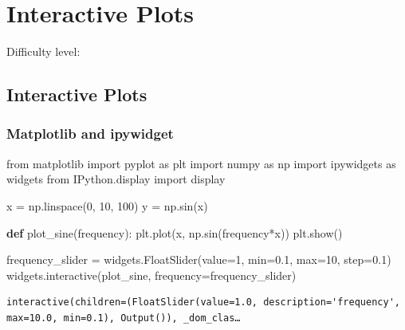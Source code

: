 \documentclass[
  letterpaper,
  DIV=11,
  numbers=noendperiod]{scrreprt}
\newenvironment{Shaded}{\begin{snugshade}}{\end{snugshade}}
\newcommand{\BuiltInTok}[1]{\textcolor[rgb]{0.00,0.23,0.31}{#1}}
\newcommand{\DecValTok}[1]{\textcolor[rgb]{0.68,0.00,0.00}{#1}}
\newcommand{\FloatTok}[1]{\textcolor[rgb]{0.68,0.00,0.00}{#1}}
\newcommand{\ImportTok}[1]{\textcolor[rgb]{0.00,0.46,0.62}{#1}}
\newcommand{\KeywordTok}[1]{\textcolor[rgb]{0.00,0.23,0.31}{\textbf{#1}}}
\newcommand{\NormalTok}[1]{\textcolor[rgb]{0.00,0.23,0.31}{#1}}
\newcommand{\OperatorTok}[1]{\textcolor[rgb]{0.37,0.37,0.37}{#1}}
\begin{document}
\chapter{Interactive Plots}\label{interactive-plots}

Difficulty level: { }

\section*{Interactive Plots}\label{interactive-plots-1}


\subsection*{Matplotlib and ipywidget}\label{matplotlib-and-ipywidget}

\begin{Shaded}
\begin{Highlighting}[]
\ImportTok{from}\NormalTok{ matplotlib }\ImportTok{import}\NormalTok{ pyplot }\ImportTok{as}\NormalTok{ plt}
\ImportTok{import}\NormalTok{ numpy }\ImportTok{as}\NormalTok{ np}
\ImportTok{import}\NormalTok{ ipywidgets }\ImportTok{as}\NormalTok{ widgets}
\ImportTok{from}\NormalTok{ IPython.display }\ImportTok{import}\NormalTok{ display}

\NormalTok{x }\OperatorTok{=}\NormalTok{ np.linspace(}\DecValTok{0}\NormalTok{, }\DecValTok{10}\NormalTok{, }\DecValTok{100}\NormalTok{)}
\NormalTok{y }\OperatorTok{=}\NormalTok{ np.sin(x)}

\KeywordTok{def}\NormalTok{ plot\_sine(frequency):}
\NormalTok{    plt.plot(x, np.sin(frequency}\OperatorTok{*}\NormalTok{x))}
\NormalTok{    plt.show()}
  
\NormalTok{frequency\_slider }\OperatorTok{=}\NormalTok{ widgets.FloatSlider(value}\OperatorTok{=}\DecValTok{1}\NormalTok{, }\BuiltInTok{min}\OperatorTok{=}\FloatTok{0.1}\NormalTok{, }\BuiltInTok{max}\OperatorTok{=}\DecValTok{10}\NormalTok{, step}\OperatorTok{=}\FloatTok{0.1}\NormalTok{)}
\NormalTok{widgets.interactive(plot\_sine, frequency}\OperatorTok{=}\NormalTok{frequency\_slider)}
\end{Highlighting}
\end{Shaded}

\begin{verbatim}
interactive(children=(FloatSlider(value=1.0, description='frequency', max=10.0, min=0.1), Output()), _dom_clas…
\end{verbatim}
\end{document}
